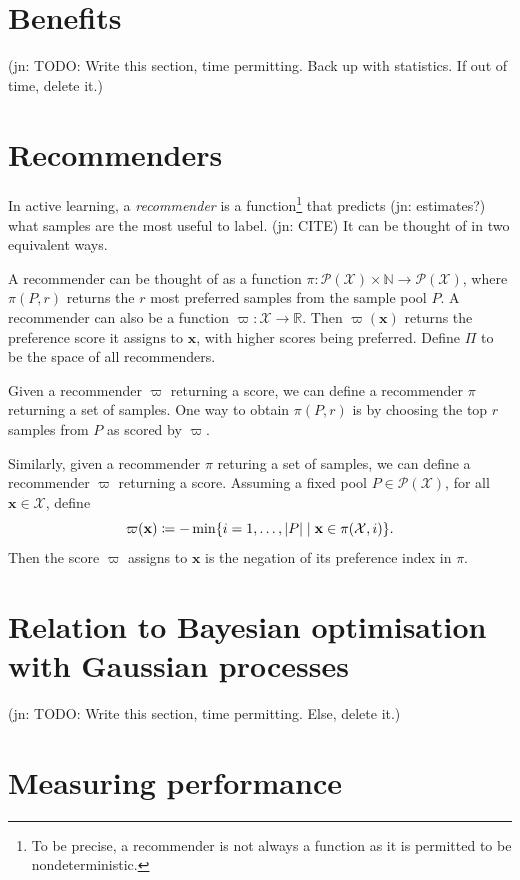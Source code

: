 \documentclass[11pt,twoside,openright]{report}
\newcommand\bbN{\mathbb{N}}
\newcommand\bbR{\mathbb{R}}
\newcommand\bx{\mathbf{x}}
\newcommand\cP{\mathcal{P}}
\newcommand\cX{\mathcal{X}}
\newcommand\abs[1]{\left|#1\right|}
\newcommand\jn[1]{{\color{red}(jn: #1)}}
\begin{document}
\section{Benefits}

\jn{TODO: Write this section, time permitting. Back up with statistics. If out of time, delete it.}

\section{Recommenders}

In active learning, a \textit{recommender} is a function\footnote{To be precise, a recommender is not always a function as it is permitted to be nondeterministic.} that predicts \jn{estimates?} what samples are the most useful to label. \jn{CITE} It can be thought of in two equivalent ways.

A recommender can be thought of as a function $\pi : \cP(\cX) \times \bbN \to \cP(\cX)$, where $\pi(P, r)$ returns the $r$ most preferred samples from the sample pool $P$. A recommender can also be a function $\varpi : \cX \to \bbR$. Then $\varpi(\bx)$ returns the preference score it assigns to $\bx$, with higher scores being preferred. Define $\Pi$ to be the space of all recommenders.

Given a recommender $\varpi$ returning a score, we can define a recommender $\pi$ returning a set of samples. One way to obtain $\pi(P, r)$ is by choosing the top $r$ samples from $P$ as scored by $\varpi$.

Similarly, given a recommender $\pi$ returing a set of samples, we can define a recommender $\varpi$ returning a score. Assuming a fixed pool $P \in \cP(\cX)$, for all $\bx\in\cX$, define\[
  \varpi(\bx) \coloneqq -\min \{ i = 1, \dots, \abs{P} \mid \bx \in \pi(\cX, i)\} \text.
\] Then the score $\varpi$ assigns to $\bx$ is the negation of its preference index in $\pi$.


\section{Relation to Bayesian optimisation with Gaussian processes}

\jn{TODO: Write this section, time permitting. Else, delete it.}


\section{Measuring performance}
\end{document}
